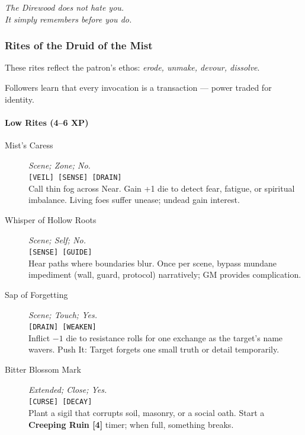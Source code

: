 \documentclass[11pt]{article}
\begin{document}
    \noindent
    \begin{center}
    \textit{The Direwood does not hate you.}\\
    \textit{It simply remembers before you do.}
    \end{center}

\subsubsection{Rites of the Druid of the Mist}
\label{rites:mistrdruid}

\noindent
These rites reflect the patron's ethos: \emph{erode, unmake, devour, dissolve}.

Followers learn that every invocation is a transaction --- power traded for identity.

\paragraph*{Low Rites (4--6 XP)}

\begin{description}

  \item[Mist's Caress] \emph{Scene; Zone; No.} \\
  \texttt{[VEIL] [SENSE] [DRAIN]} \\
  Call thin fog across Near. Gain +1 die to detect fear, fatigue, or spiritual imbalance.  
  Living foes suffer unease; undead gain interest.

  \item[Whisper of Hollow Roots] \emph{Scene; Self; No.} \\
  \texttt{[SENSE] [GUIDE]} \\
  Hear paths where boundaries blur. Once per scene, bypass mundane impediment (wall, guard, protocol) narratively; GM provides complication.

  \item[Sap of Forgetting] \emph{Scene; Touch; Yes.} \\
  \texttt{[DRAIN] [WEAKEN]} \\
  Inflict \(-1\) die to resistance rolls for one exchange as the target's name wavers.  
  Push It: Target forgets one small truth or detail temporarily.

  \item[Bitter Blossom Mark] \emph{Extended; Close; Yes.} \\
  \texttt{[CURSE] [DECAY]} \\
  Plant a sigil that corrupts soil, masonry, or a social oath.  
  Start a \textbf{Creeping Ruin [4]} timer; when full, something breaks.
  
\end{description}
\end{document}
